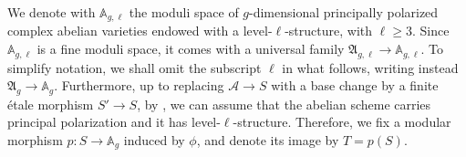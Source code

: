 \documentclass[10 pt,a4paper]{article}
\theoremstyle{plain}
\theoremstyle{definition}
\theoremstyle{named}
\begin{document}
We denote with  \(\mathbb{A}_{g,\ell}\) the moduli space of $g$-dimensional principally polarized complex abelian varieties endowed with a level-$\ell$-structure, with $\ell\ge 3$. Since  \(\mathbb{A}_{g,\ell}\) is a fine moduli space, it comes with a universal family \(\mathfrak{A}_{g,\ell} \to \mathbb{A}_{g,\ell}\). To simplify notation, we shall omit the subscript \(\ell\) in what follows, writing instead \(\mathfrak{A}_g \to \mathbb{A}_g\). Furthermore, up to replacing $\mathcal A\to S$ with a base change by a finite \'etale morphism $S'\to S$, by \cite[Proof of Theorem B.1 Devissages $(iv)-(vi)$]{DGH}, we can assume that the abelian scheme carries principal polarization and it has level-$\ell$-structure. Therefore, we fix a modular morphism \(p \colon S \to \mathbb{A}_g\) induced by $\phi$, and denote its image by \(T = p(S)\).
\end{document}
